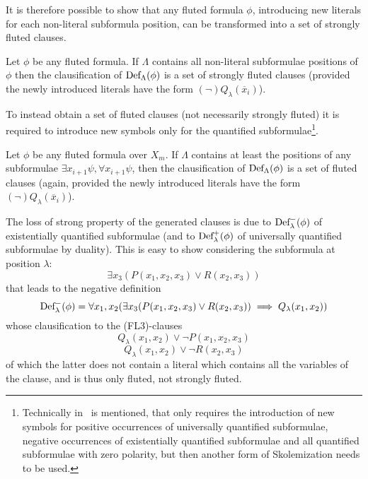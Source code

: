 It is therefore possible to show that any fluted formula \(\phi\), introducing new literals for each non-literal subformula position, can be transformed into a set of strongly fluted clauses.

\begin{lemma}
  Let \(\phi\) be any fluted formula. If \(\Lambda\) contains all non-literal subformulae positions of \(\phi\) then the clausification of \(\fldef{\Lambda}{\phi}\) is a set of strongly fluted clauses (provided the newly introduced literals have the form \((\neg)Q_\lambda(\overline{x}_i)\)).
\end{lemma}

To instead obtain a set of fluted clauses (not necessarily strongly fluted) it is required to introduce new symbols only for the quantified subformulae\footnote{Technically in~\cite{hustadt2000resolution} is mentioned, that only requires the introduction of new symbols for positive occurrences of universally quantified subformulae, negative occurrences of existentially quantified subformulae and all quantified subformulae with zero polarity, but then another form of Skolemization needs to be used. }.

\begin{lemma}\label{lem:fluted-def-constraints}
  Let \(\phi\) be any fluted formula over \(X_m\). If \(\Lambda\) contains at least the positions of any subformulae \(\exists x_{i+1}\psi, \forall x_{i+1}\psi\), then the clausification of \(\fldef{\Lambda}{\phi}\) is a set of fluted clauses (again, provided the newly introduced literals have the form \((\neg)Q_\lambda(\overline{x}_i)\)).
\end{lemma}

The loss of strong property of the generated clauses is due to \(\fldef{\lambda}[-]{\phi}\) of existentially quantified subformulae (and to \(\fldef{\lambda}[+]{\phi}\) of universally quantified subformulae by duality).
This is easy to show considering the subformula at position \(\lambda\):
  \[
    \exists x_3 (P(x_1,x_2,x_3) \lor R(x_2,x_3))
  \]
that leads to the negative definition
  \[
    \fldef{\lambda}[-]{\phi} = \forall x_1,x_2(\exists x_3 (P(x_1,x_2,x_3) \lor R(x_2,x_3)) \implies Q_\lambda(x_1,x_2))
  \]
whose clausification to the (FL3)-clauses
  \[
    Q_\lambda(x_1,x_2) \lor \neg P(x_1,x_2,x_3)
  \]
  \[
    Q_\lambda(x_1,x_2) \lor \neg R(x_2,x_3)
  \]
of which the latter does not contain a literal which contains all the variables of the clause, and is thus only fluted, not strongly fluted.

